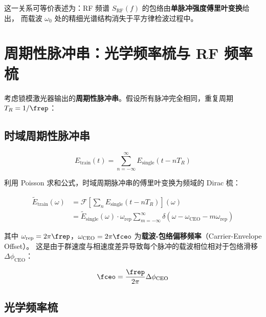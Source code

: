 \documentclass[11pt,a4paper]{article}
\newcommand{\FT}{\mathcal{F}}
\begin{document}
这一关系可等价表述为：RF 频谱 $S_{\text{RF}}(f)$ 的包络由\textbf{单脉冲强度傅里叶变换}给出，
而载波 $\omega_0$ 处的精细光谱结构消失于平方律检波过程中。

\section{周期性脉冲串：光学频率梳与 RF 频率梳}

考虑锁模激光器输出的\textbf{周期性脉冲串}。假设所有脉冲完全相同，重复周期 $T_R = 1/\frep$：

\subsection{时域周期性脉冲串}

\begin{equation}\label{eq:pulse_train}
E_{\text{train}}(t) = \sum_{n=-\infty}^{\infty} E_{\text{single}}(t - n T_R)
\end{equation}

利用 Poisson 求和公式，时域周期脉冲串的傅里叶变换为频域的 Dirac 梳：

\begin{equation}\label{eq:comb_frequency}
\begin{aligned}
\tilde{E}_{\text{train}}(\omega) &= \FT\left[ \sum_n E_{\text{single}}(t - n T_R) \right](\omega) \\
&= \tilde{E}_{\text{single}}(\omega) \cdot \omega_{\text{rep}} \sum_{m=-\infty}^{\infty} \delta(\omega - \omega_{\text{CEO}} - m \omega_{\text{rep}})
\end{aligned}
\end{equation}

其中 $\omega_{\text{rep}} = 2\pi \frep$，$\omega_{\text{CEO}} = 2\pi \fceo$ 为\textbf{载波-包络偏移频率}（Carrier-Envelope Offset）。
这是由于群速度与相速度差异导致每个脉冲的载波相位相对于包络滑移 $\Delta\phi_{\text{CEO}}$：

\begin{equation}\label{eq:ceo}
\fceo = \frac{\frep}{2\pi} \Delta\phi_{\text{CEO}}
\end{equation}

\subsection{光学频率梳}
\end{document}
